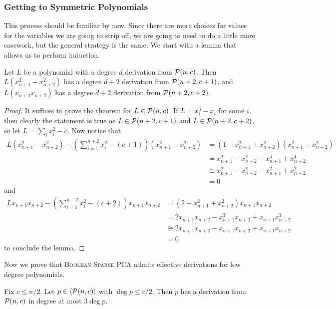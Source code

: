 \subsubsection{Getting to Symmetric Polynomials}
This process should be familiar by now. Since there are more choices for values for the variables we are going to strip off, we are going to need to do a little more casework, but the general strategy is the same. We start with a lemma that allows us to perform induction.
\begin{lemma}\label{lem:bcpa-induct}
Let $L$ be a polynomial with a degree $d$ derivation from $\mathcal P(n,c)$. Then $L(x_{n+1}^2-x_{n+2}^2)$ has a degree $d+2$ derivation from $\mathcal P(n+2,c+1)$, and $L(x_{n+1}x_{n+2})$ has a degree $d+2$ derivation from $\mathcal P(n+2,c+2)$.
\end{lemma}
\begin{proof}
It suffices to prove the theorem for $L \in \mathcal P(n,c)$. If $L = x_i^3 - x_i$ for some $i$, then clearly the statement is true as $L \in \mathcal P(n+2,c+1)$ and $L \in \mathcal P(n+2,c+2)$, so let $L = \sum_i x_i^2 - c$. Now notice that 
\begin{align*}
L(x_{n+1}^2 - x_{n+2}^2) - \left(\sum_{i=1}^{n+2} x_i^2 - (c+1)\right)(x_{n+1}^2-x_{n+2}^2) &= (1-x_{n+1}^2+x_{n+2}^2)(x_{n+1}^2-x_{n+2}^2) \\
&= x_{n+1}^2 - x_{n+2}^2 - x_{n+1}^4 + x_{n+2}^4  \\
&\cong x_{n+1}^2 - x_{n+2}^2 - x_{n+1}^2 + x_{n+2}^2 \\
&= 0
\end{align*}
and 
\begin{align*}
Lx_{n+1}x_{n+2} - \left(\sum_{i=1}^{n-2} x_i^2 - (c+2)\right)x_{n+1}x_{n+2} &= (2-x_{n+1}^2 + x_{n+2}^2)x_{n+1}x_{n+2} \\
&= 2x_{n+1}x_{n+2} - x_{n+1}^3x_{n+2} + x_{n+1}x_{n+2}^3 \\
&\cong 2x_{n+1}x_{n+2} - x_{n+1}x_{n+2} + x_{n+1}x_{n+2} \\
&= 0
\end{align*}
to conclude the lemma. 
\end{proof}
Now we prove that \textsc{Boolean Sparse PCA} admits effective derivations for low degree polynomials.
\begin{lemma}
Fix $c \leq n/2$. Let $p \in \langle \mathcal P(n,c) \rangle$ with $\deg p \leq c/2$. Then $p$ has a derivation from $\mathcal P(n,c)$ in degree at most $3\deg p$.
\end{lemma}

